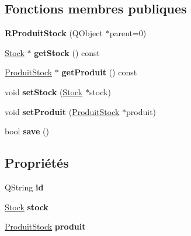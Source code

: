 \subsection*{Fonctions membres publiques}
\begin{DoxyCompactItemize}
\item 
\hypertarget{class_r_produit_stock_a1df8141fd615ef92ef339aaa5aaebda2}{
{\bfseries RProduitStock} (QObject $\ast$parent=0)}
\label{d1/dbe/class_r_produit_stock_a1df8141fd615ef92ef339aaa5aaebda2}

\item 
\hypertarget{class_r_produit_stock_aeac07ea2f11a5a160541a0988c5f415e}{
\hyperlink{class_stock}{Stock} $\ast$ {\bfseries getStock} () const }
\label{d1/dbe/class_r_produit_stock_aeac07ea2f11a5a160541a0988c5f415e}

\item 
\hypertarget{class_r_produit_stock_a0e5fb6e3c1d471d83bef0a5355f777f7}{
\hyperlink{class_produit_stock}{ProduitStock} $\ast$ {\bfseries getProduit} () const }
\label{d1/dbe/class_r_produit_stock_a0e5fb6e3c1d471d83bef0a5355f777f7}

\item 
\hypertarget{class_r_produit_stock_a1bba3f9155e004aa1b59c7cc39f2ff22}{
void {\bfseries setStock} (\hyperlink{class_stock}{Stock} $\ast$stock)}
\label{d1/dbe/class_r_produit_stock_a1bba3f9155e004aa1b59c7cc39f2ff22}

\item 
\hypertarget{class_r_produit_stock_a24cc1901f0ff507f4edb67eedc0639ff}{
void {\bfseries setProduit} (\hyperlink{class_produit_stock}{ProduitStock} $\ast$produit)}
\label{d1/dbe/class_r_produit_stock_a24cc1901f0ff507f4edb67eedc0639ff}

\item 
\hypertarget{class_r_produit_stock_a44f49bedc1bfa329a540f25bc2baf1d1}{
bool {\bfseries save} ()}
\label{d1/dbe/class_r_produit_stock_a44f49bedc1bfa329a540f25bc2baf1d1}

\end{DoxyCompactItemize}
\subsection*{Propriétés}
\begin{DoxyCompactItemize}
\item 
\hypertarget{class_r_produit_stock_a0959899355c4a60eb3e2620f02b5d0cb}{
QString {\bfseries id}}
\label{d1/dbe/class_r_produit_stock_a0959899355c4a60eb3e2620f02b5d0cb}

\item 
\hypertarget{class_r_produit_stock_a99577c4b996b6e4ba004c39cf451ebc5}{
\hyperlink{class_stock}{Stock} {\bfseries stock}}
\label{d1/dbe/class_r_produit_stock_a99577c4b996b6e4ba004c39cf451ebc5}

\item 
\hypertarget{class_r_produit_stock_a508086756c4ded5d2e92043a1db9c6a2}{
\hyperlink{class_produit_stock}{ProduitStock} {\bfseries produit}}
\label{d1/dbe/class_r_produit_stock_a508086756c4ded5d2e92043a1db9c6a2}

\end{DoxyCompactItemize}


